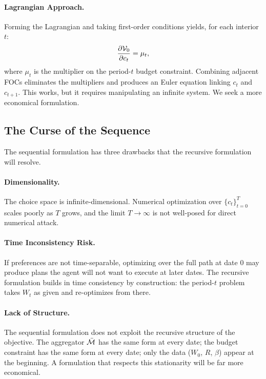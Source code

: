 \paragraph{Lagrangian Approach.}
Forming the Lagrangian and taking first-order conditions yields, for each interior $t$:
\begin{equation}
\frac{\partial \mathcal{V}_0}{\partial c_t} = \mu_t,
\label{eq:lagrangian-foc}
\end{equation}
where $\mu_t$ is the multiplier on the period-$t$ budget constraint. Combining adjacent FOCs eliminates the multipliers and produces an Euler equation linking $c_t$ and $c_{t+1}$. This works, but it requires manipulating an infinite system. We seek a more economical formulation.

\subsection{The Curse of the Sequence}
\label{subsec:dp-curse-sequence}

The sequential formulation has three drawbacks that the recursive formulation will resolve.

\paragraph{Dimensionality.}
The choice space is infinite-dimensional. Numerical optimization over $\{c_t\}_{t=0}^{T}$ scales poorly as $T$ grows, and the limit $T \to \infty$ is not well-posed for direct numerical attack.

\paragraph{Time Inconsistency Risk.}
If preferences are not time-separable, optimizing over the full path at date $0$ may produce plans the agent will not want to execute at later dates. The recursive formulation builds in time consistency by construction: the period-$t$ problem takes $W_t$ as given and re-optimizes from there.

\paragraph{Lack of Structure.}
The sequential formulation does not exploit the recursive structure of the objective. The aggregator $\bar{\mathcal{M}}$ has the same form at every date; the budget constraint has the same form at every date; only the data ($W_0$, $R$, $\beta$) appear at the beginning. A formulation that respects this stationarity will be far more economical.

